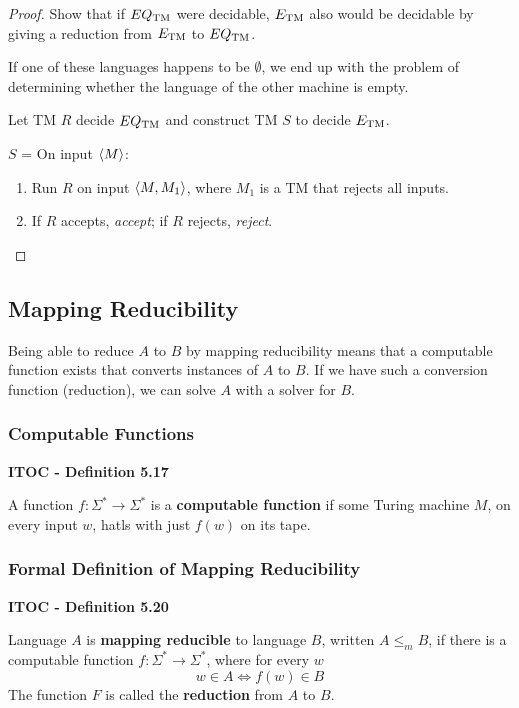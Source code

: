 \begin{mdframed}
\begin{proof}
Show that if $EQ_{\text{TM}}$ were decidable, $E_{\text{TM}}$ also would be decidable by giving a reduction from $E_{\text{TM}}$ to $EQ_{\text{TM}}$.

If one of these languages happens to be $\emptyset$, we end up with the problem of determining whether the language of the other machine is empty.

Let TM $R$ decide $EQ_{\text{TM}}$ and construct TM $S$ to decide $E_{\text{TM}}$.


\medskip
$S$ = On input $\langle{M}\rangle$:
\begin{enumerate}
\item Run $R$ on input $\langle{M, M_1}\rangle$, where $M_1$ is a TM that rejects all inputs.
\item If $R$ accepts, \textit{accept}; if $R$ rejects, \textit{reject}.
\end{enumerate}
\end{proof}
\end{mdframed}

\subsection{Mapping Reducibility}

Being able to reduce $A$ to $B$ by mapping reducibility means that a computable function exists that converts instances of $A$ to $B$. If we have such a conversion function (reduction), we can solve $A$ with a solver for $B$.

\subsubsection{Computable Functions}

\begin{shaded}
\textbf{ITOC - Definition 5.17}

\medskip
A function $f : \Sigma^* \rightarrow \Sigma^*$ is a \textbf{computable function} if some Turing machine $M$, on every input $w$, hatls with just $f(w)$ on its tape.
\end{shaded}

\subsubsection{Formal Definition of Mapping Reducibility}

\begin{shaded}
\textbf{ITOC - Definition 5.20}

\medskip
Language $A$ is \textbf{mapping reducible} to language $B$, written $A \leq_m B$, if there is a computable function $f: \Sigma^* \rightarrow\Sigma^*$, where for every $w$
\[
w \in A \Leftrightarrow f(w) \in B
\]
The function $F$ is called the \textbf{reduction} from $A$ to $B$.
\end{shaded}

